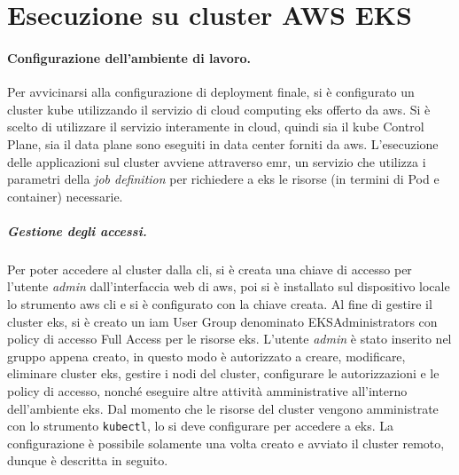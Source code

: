 \documentclass[12pt,a4paper,fleqn,titlepage]{report}
\begin{document}
    \section{Esecuzione su cluster AWS EKS}
        \paragraph{Configurazione dell'ambiente di lavoro.}
        Per avvicinarsi alla configurazione di deployment finale, si è configurato un \gls{cluster} \gls{kube} utilizzando il servizio di cloud computing \gls{eks} offerto da \gls{aws}. Si è scelto di utilizzare il servizio interamente in cloud, quindi sia il \gls{kube} Control Plane, sia il data plane sono eseguiti in data center forniti da \gls{aws}. L'esecuzione delle applicazioni sul \gls{cluster} avviene attraverso \gls{emr}, un servizio che utilizza i parametri della \emph{job definition} per richiedere a \gls{eks} le risorse (in termini di Pod e \gls{container}) necessarie.
            \subparagraph{Gestione degli accessi.}
            Per poter accedere al \gls{cluster} dalla \gls{cli}, si è creata una chiave di accesso per l'utente \emph{admin} dall'interfaccia web di \gls{aws}, poi si è installato sul dispositivo locale lo strumento \gls{aws} \gls{cli} e si è configurato con la chiave creata. Al fine di gestire il \gls{cluster} \gls{eks}, si è creato un \gls{iam} User Group denominato EKSAdministrators con policy di accesso Full Access per le risorse \gls{eks}. L'utente \emph{admin} è stato inserito nel gruppo appena creato, in questo modo è autorizzato a creare, modificare, eliminare cluster \gls{eks}, gestire i nodi del \gls{cluster}, configurare le autorizzazioni e le policy di accesso, nonché eseguire altre attività amministrative all'interno dell'ambiente \gls{eks}.
            Dal momento che le risorse del \gls{cluster} vengono amministrate con lo strumento \lstinline{kubectl}, lo si deve configurare per accedere a \gls{eks}. La configurazione è possibile solamente una volta creato e avviato il \gls{cluster} remoto, dunque è descritta in seguito.
\end{document}
